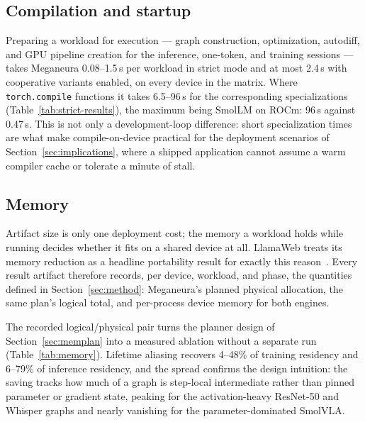 \documentclass[10pt,twocolumn]{article}
\newcommand{\system}{Meganeura}
\newcommand{\code}[1]{\texttt{#1}}
\begin{document}
\subsection{Compilation and startup}

Preparing a workload for execution --- graph construction, optimization,
autodiff, and GPU pipeline creation for the inference, one-token, and
training sessions --- takes \system{} 0.08--1.5\,s per workload in strict
mode and at most 2.4\,s with cooperative variants enabled, on every device
in the matrix. Where \code{torch.compile} functions it takes 6.5--96\,s for
the corresponding specializations (Table~\ref{tab:strict-results}), the
maximum being SmolLM on ROCm: 96\,s against 0.47\,s. This is not only a
development-loop difference: short specialization times are what make
compile-on-device practical for the deployment scenarios of
Section~\ref{sec:implications}, where a shipped application cannot assume a
warm compiler cache or tolerate a minute of stall.

\subsection{Memory}
\label{sec:memory}

Artifact size is only one deployment cost; the memory a workload holds while
running decides whether it fits on a shared device at all. LlamaWeb treats
its memory reduction as a headline portability result for exactly this
reason~\cite{levine2026llamaweb}. Every result artifact therefore records,
per device, workload, and phase, the quantities defined in
Section~\ref{sec:method}: \system{}'s planned physical allocation, the same
plan's logical total, and per-process device memory for both engines.

\begin{table}[t]
\centering
\footnotesize
\setlength{\tabcolsep}{3.6pt}

\caption{The memory-planner ablation, measured: logical buffer totals versus
physically allocated bytes after lifetime-based aliasing
(Section~\ref{sec:memplan}). Plans are shape-deterministic, so these values
vary by at most 1\% across backends; the artifact records all devices.
Neither engine's timed training session holds optimizer state.}
\label{tab:memory}
\end{table}

The recorded logical/physical pair turns the planner design of
Section~\ref{sec:memplan} into a measured ablation without a separate run
(Table~\ref{tab:memory}). Lifetime aliasing recovers 4--48\% of training
residency and 6--79\% of inference residency, and the spread confirms the
design intuition: the saving tracks how much of a graph is step-local
intermediate rather than pinned parameter or gradient state, peaking for the
activation-heavy ResNet-50 and Whisper graphs and nearly vanishing for the
parameter-dominated SmolVLA.
\end{document}
